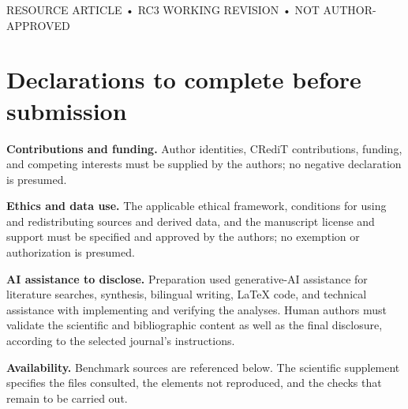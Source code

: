 \documentclass[10pt,a4paper]{article}
\begin{document}
\thispagestyle{empty}
\begin{center}
{\small RESOURCE ARTICLE • RC3 WORKING REVISION • NOT AUTHOR-APPROVED\par}
\vspace{10pt}
{\LARGE\bfseries\PaperTitle\par}
\vspace{12pt}
{\normalsize\PaperAuthors\par}
\vspace{3pt}
{\small\itshape\PaperAffiliation\par}
\end{center}
\vspace{8pt}
\begin{abstract}

\end{abstract}
\vspace{10pt}

\section*{Declarations to complete before submission}
\noindent\textbf{Contributions and funding.} Author identities, CRediT contributions, funding, and competing interests must be supplied by the authors; no negative declaration is presumed.\par
\noindent\textbf{Ethics and data use.} The applicable ethical framework, conditions for using and redistributing sources and derived data, and the manuscript license and support must be specified and approved by the authors; no exemption or authorization is presumed.\par
\noindent\textbf{AI assistance to disclose.} Preparation used generative-AI assistance for literature searches, synthesis, bilingual writing, LaTeX code, and technical assistance with implementing and verifying the analyses. Human authors must validate the scientific and bibliographic content as well as the final disclosure, according to the selected journal's instructions.\par
\noindent\textbf{Availability.} Benchmark sources are referenced below. The scientific supplement specifies the files consulted, the elements not reproduced, and the checks that remain to be carried out.


\end{document}
